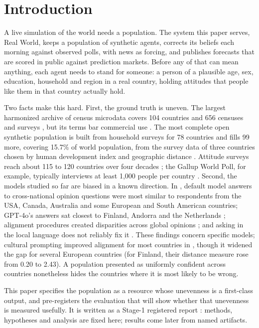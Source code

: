 \documentclass[10pt]{article}
\begin{document}
\section{Introduction}

A live simulation of the world needs a population. The system this paper serves, Real World, keeps a population of synthetic agents, corrects its beliefs each morning against observed polls, with news as forcing, and publishes forecasts that are scored in public against prediction markets. Before any of that can mean anything, each agent needs to stand for someone: a person of a plausible age, sex, education, household and region in a real country, holding attitudes that people like them in that country actually hold.

Two facts make this hard. First, the ground truth is uneven. The largest harmonized archive of census microdata covers 104 countries and 656 censuses and surveys \citep{ipumshome}, but its terms bar commercial use \citep{ipumsterms}. The most complete open synthetic population is built from household surveys for 78 countries and fills 99 more, covering 15.7\% of world population, from the survey data of three countries chosen by human development index and geographic distance \citep{ton2024glopop}. Attitude surveys reach about 115 to 120 countries over four decades \citep{haerpfer2022wvs}; the Gallup World Poll, for example, typically interviews at least 1,000 people per country \citep{gallupwp}. Second, the models studied so far are biased in a known direction. In \citet{durmus2023}, default model answers to cross-national opinion questions were most similar to respondents from the USA, Canada, Australia and some European and South American countries; GPT-4o's answers sat closest to Finland, Andorra and the Netherlands \citep{tao2024}; alignment procedures created disparities across global opinions \citep{ryan2024}; and asking in the local language does not reliably fix it \citep{durmus2023,kwok2024,bulte2026}. These findings concern specific models; cultural prompting improved alignment for most countries in \citet{tao2024}, though it widened the gap for several European countries (for Finland, their distance measure rose from 0.20 to 2.43). A population presented as uniformly confident across countries nonetheless hides the countries where it is most likely to be wrong.

This paper specifies the population as a resource whose unevenness is a first-class output, and pre-registers the evaluation that will show whether that unevenness is measured usefully. It is written as a Stage-1 registered report \citep{nosek2018}: methods, hypotheses and analysis are fixed here; results come later from named artifacts.
\end{document}
